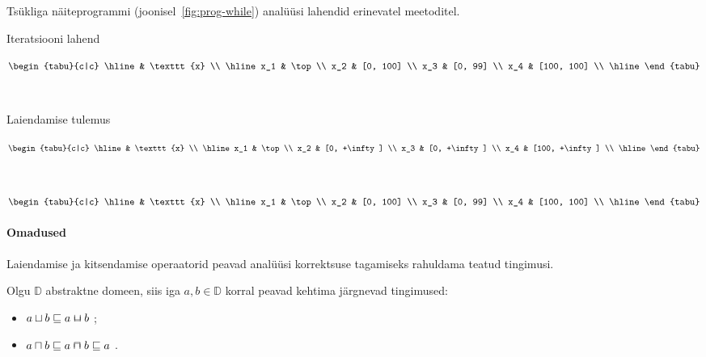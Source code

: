 \documentclass[../thesis.tex]{subfiles}
\begin{document}
\begin{table}
	\caption{Tsükliga näiteprogrammi (joonisel~\ref{fig:prog-while}) analüüsi lahendid erinevatel meetoditel.}
	\centering
	\begin{subtable}[t]{0.3\textwidth}
		\caption{Iteratsiooni lahend}
		\centering
		$\begin{tabu}{c|c}
		\hline
		 & \texttt{x} \\
		\hline
		x_1 & \top \\
		x_2 & [0, 100] \\
		x_3 & [0, 99] \\
		x_4 & [100, 100] \\
		\hline
		\end{tabu}$
		\label{tab:while-iter}
	\end{subtable}
	~
	\begin{subtable}[t]{0.3\textwidth}
		\caption{Laiendamise tulemus}
		\centering
		$\begin{tabu}{c|c}
		\hline
		 & \texttt{x} \\
		\hline
		x_1 & \top \\
		x_2 & [0, +\infty] \\
		x_3 & [0, +\infty] \\
		x_4 & [100, +\infty] \\
		\hline
		\end{tabu}$
		\label{tab:while-widen}
	\end{subtable}
	~
	\begin{subtable}[t]{0.3\textwidth}
		\caption{Kitsendamise tulemus}
		\centering
		$\begin{tabu}{c|c}
		\hline
		 & \texttt{x} \\
		\hline
		x_1 & \top \\
		x_2 & [0, 100] \\
		x_3 & [0, 99] \\
		x_4 & [100, 100] \\
		\hline
		\end{tabu}$
		\label{tab:while-narrow}
	\end{subtable}
	\label{tab:itersolve-while}
\end{table}

\paragraph{Omadused}
Laiendamise ja kitsendamise operaatorid peavad analüüsi korrektsuse tagamiseks rahuldama teatud tingimusi.

\noindent
Olgu $\mathbb{D}$ abstraktne domeen, siis iga $a, b \in \mathbb{D}$ korral peavad kehtima järgnevad tingimused:
\begin{itemize}[nosep]
	\item $a \sqcup b \sqleq a \widen b$ \cite[61]{seidl_foundations};
	\item $a \sqcap b \sqleq a \narrow b \sqleq a$ \cite[66]{seidl_foundations}.
\end{itemize}
\end{document}
